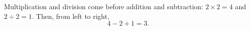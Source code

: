 Multiplication and division come before addition and subtraction: $2\times2=4$ and $2\div2=1$. Then, from left to right,
\[4-2+1=\boxed{3}.\]
